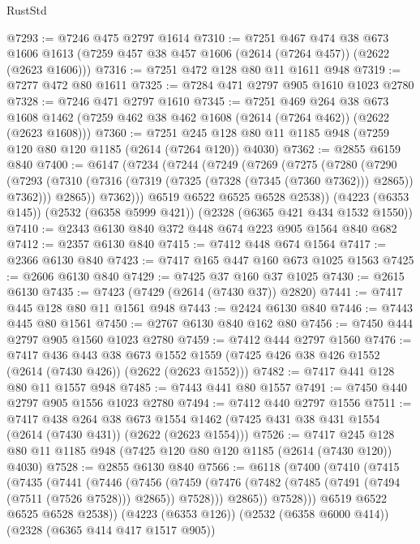 \begin{lexlean}{RustStd}
\begin{coremodule}
@7293 := @7246 @475 @2797 @1614
@7310 := @7251
    @467
    @474
    @38
    @673
    @1606
    @1613
    (@7259 @457 @38 @457 @1606 (@2614 (@7264 @457)) (@2622 (@2623 @1606)))
@7316 := @7251 @472 @128 @80 @11 @1611 @948
@7319 := @7277 @472 @80 @1611
@7325 := @7284 @471 @2797 @905 @1610 @1023 @2780
@7328 := @7246 @471 @2797 @1610
@7345 := @7251
    @469
    @264
    @38
    @673
    @1608
    @1462
    (@7259 @462 @38 @462 @1608 (@2614 (@7264 @462)) (@2622 (@2623 @1608)))
@7360 := @7251 @245 @128 @80 @11 @1185 @948 (@7259 @120 @80 @120 @1185 (@2614 (@7264 @120)) @4030)
@7362 := @2855 @6159 @840
@7400 := @6147
    (@7234
      (@7244
        (@7249
          (@7269
            (@7275
              (@7280
                (@7290
                  (@7293 (@7310 (@7316 (@7319 (@7325 (@7328 (@7345 (@7360 @7362))) @2865)) @7362)))
                  @2865))
              @7362)))
        @6519
        @6522
        @6525
        @6528
        @2538))
    (@4223 (@6353 @145))
    (@2532 (@6358 @5999 @421))
    (@2328 (@6365 @421 @434 @1532 @1550))
@7410 := @2343 @6130 @840 @372 @448 @674 @223 @905 @1564 @840 @682
@7412 := @2357 @6130 @840
@7415 := @7412 @448 @674 @1564
@7417 := @2366 @6130 @840
@7423 := @7417 @165 @447 @160 @673 @1025 @1563
@7425 := @2606 @6130 @840
@7429 := @7425 @37 @160 @37 @1025
@7430 := @2615 @6130
@7435 := @7423 (@7429 (@2614 (@7430 @37)) @2820)
@7441 := @7417 @445 @128 @80 @11 @1561 @948
@7443 := @2424 @6130 @840
@7446 := @7443 @445 @80 @1561
@7450 := @2767 @6130 @840 @162 @80
@7456 := @7450 @444 @2797 @905 @1560 @1023 @2780
@7459 := @7412 @444 @2797 @1560
@7476 := @7417
    @436
    @443
    @38
    @673
    @1552
    @1559
    (@7425 @426 @38 @426 @1552 (@2614 (@7430 @426)) (@2622 (@2623 @1552)))
@7482 := @7417 @441 @128 @80 @11 @1557 @948
@7485 := @7443 @441 @80 @1557
@7491 := @7450 @440 @2797 @905 @1556 @1023 @2780
@7494 := @7412 @440 @2797 @1556
@7511 := @7417
    @438
    @264
    @38
    @673
    @1554
    @1462
    (@7425 @431 @38 @431 @1554 (@2614 (@7430 @431)) (@2622 (@2623 @1554)))
@7526 := @7417 @245 @128 @80 @11 @1185 @948 (@7425 @120 @80 @120 @1185 (@2614 (@7430 @120)) @4030)
@7528 := @2855 @6130 @840
@7566 := @6118
    (@7400
      (@7410
        (@7415
          (@7435
            (@7441
              (@7446
                (@7456
                  (@7459 (@7476 (@7482 (@7485 (@7491 (@7494 (@7511 (@7526 @7528))) @2865)) @7528)))
                  @2865))
              @7528)))
        @6519
        @6522
        @6525
        @6528
        @2538))
    (@4223 (@6353 @126))
    (@2532 (@6358 @6000 @414))
    (@2328 (@6365 @414 @417 @1517 @905))

\end{coremodule}
\end{lexlean}
